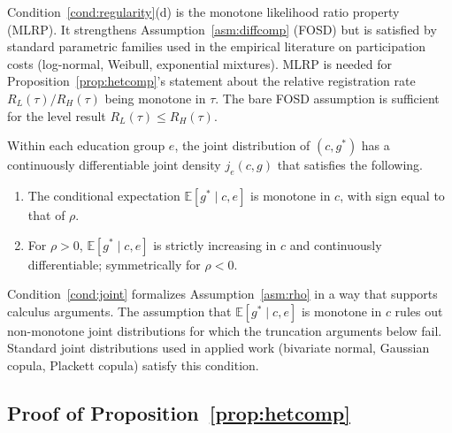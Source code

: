 Condition~\ref{cond:regularity}(d) is the monotone likelihood ratio property (MLRP). It strengthens Assumption~\ref{asm:diffcomp} (FOSD) but is satisfied by standard parametric families used in the empirical literature on participation costs (log-normal, Weibull, exponential mixtures). MLRP is needed for Proposition~\ref{prop:hetcomp}'s statement about the relative registration rate $R_L(\tau)/R_H(\tau)$ being monotone in $\tau$. The bare FOSD assumption is sufficient for the level result $R_L(\tau) \leq R_H(\tau)$.

\begin{regularitycondition}
\label{cond:joint}
Within each education group $e$, the joint distribution of $(c, g^*)$ has a continuously differentiable joint density $j_e(c, g)$ that satisfies the following.
\begin{enumerate}
    \item[(a)] The conditional expectation $\mathbb{E}[g^* \mid c, e]$ is monotone in $c$, with sign equal to that of $\rho$.
    \item[(b)] For $\rho > 0$, $\mathbb{E}[g^* \mid c, e]$ is strictly increasing in $c$ and continuously differentiable; symmetrically for $\rho < 0$.
\end{enumerate}
\end{regularitycondition}

Condition~\ref{cond:joint} formalizes Assumption~\ref{asm:rho} in a way that supports calculus arguments. The assumption that $\mathbb{E}[g^* \mid c, e]$ is monotone in $c$ rules out non-monotone joint distributions for which the truncation arguments below fail. Standard joint distributions used in applied work (bivariate normal, Gaussian copula, Plackett copula) satisfy this condition.

\subsection{Proof of Proposition~\ref{prop:hetcomp}}
\label{ssec:proof_hetcomp}

